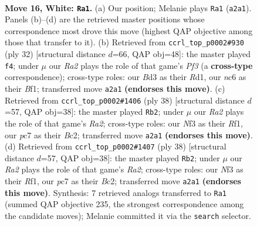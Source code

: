 \documentclass[11pt]{article}
\begin{document}
\clearpage

\begin{figure}[p]\centering
\begin{subfigure}{0.46\textwidth}\centering
\resizebox{\linewidth}{!}{%
\newchessgame
\chessboard[
  setfen={r1b1kbr1/2p5/1pn3p1/p4p1p/3P4/1PPB1NP1/R4P1P/2B2RK1 w q - 2 16},
  showmover=false,
  pgfstyle=straightmove, color=movearrow, markmove={a2-a1}
]}
\caption{}
\end{subfigure}\hfill
\begin{subfigure}{0.46\textwidth}\centering
\resizebox{\linewidth}{!}{%
\newchessgame
\chessboard[
  setfen={r2bbrk1/5pp1/p3p3/1p5p/4P2P/P1N2P2/1PP3P1/1K1R1B1R w - - 0 17},
  showmover=false,
  pgfstyle=straightmove, color=movearrow, markmove={f3-f4}
]}
\caption{}
\end{subfigure}
\\[4pt]
\begin{subfigure}{0.46\textwidth}\centering
\resizebox{\linewidth}{!}{%
\newchessgame
\chessboard[
  setfen={r1b1k2r/pp3ppp/2p1p3/1P4B1/1b1P4/4PN2/R1B1nPPP/5R1K w kq - 3 20},
  showmover=false,
  pgfstyle=straightmove, color=movearrow, markmove={a2-b2}
]}
\caption{}
\end{subfigure}\hfill
\begin{subfigure}{0.46\textwidth}\centering
\resizebox{\linewidth}{!}{%
\newchessgame
\chessboard[
  setfen={r1b1k2r/pp3ppp/2p1p3/1P4B1/1b1P4/4PN2/R1B1nPPP/5R1K w kq - 3 20},
  showmover=false,
  pgfstyle=straightmove, color=movearrow, markmove={a2-b2}
]}
\caption{}
\end{subfigure}
\caption{\textbf{Move 16, White: \texttt{Ra1}.} (a) Our position; Melanie plays \texttt{Ra1} (\texttt{a2a1}). Panels (b)--(d) are the retrieved master positions whose correspondence most drove this move (highest QAP objective among those that transfer to it). (b) Retrieved from \texttt{ccrl\_top\_p0002\#930} (ply 32) [structural distance $d$=66, QAP obj=48]: the master played \texttt{f4}; under $\mu$ our \emph{Ra2} plays the role of that game's \emph{Pf3} (a \textbf{cross-type} correspondence); cross-type roles: our \emph{B}d3 as their \emph{R}d1, our \emph{n}c6 as their \emph{B}f1; transferred move \texttt{a2a1} \textbf{(endorses this move)}. (c) Retrieved from \texttt{ccrl\_top\_p0002\#1406} (ply 38) [structural distance $d$=57, QAP obj=38]: the master played \texttt{Rb2}; under $\mu$ our \emph{Ra2} plays the role of that game's \emph{Ra2}; cross-type roles: our \emph{N}f3 as their \emph{R}f1, our \emph{p}c7 as their \emph{B}c2; transferred move \texttt{a2a1} \textbf{(endorses this move)}. (d) Retrieved from \texttt{ccrl\_top\_p0002\#1407} (ply 38) [structural distance $d$=57, QAP obj=38]: the master played \texttt{Rb2}; under $\mu$ our \emph{Ra2} plays the role of that game's \emph{Ra2}; cross-type roles: our \emph{N}f3 as their \emph{R}f1, our \emph{p}c7 as their \emph{B}c2; transferred move \texttt{a2a1} \textbf{(endorses this move)}. Synthesis: 7 retrieved analogs transferred to \texttt{Ra1} (summed QAP objective 235, the strongest correspondence among the candidate moves); Melanie committed it via the \texttt{search} selector.}
\label{fig:thought-m30}
\end{figure}
\end{document}
